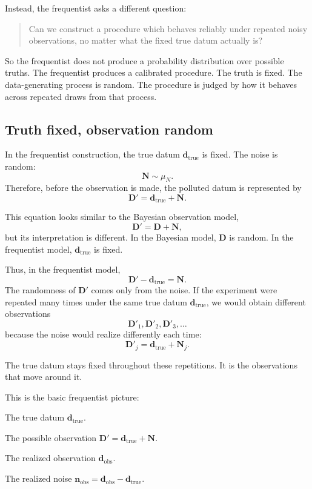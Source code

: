 \documentclass[11pt]{article}
\newcommand{\muN}{\mu_N}
\newcommand{\Drand}{\mathbf D}
\newcommand{\Dobsrand}{\mathbf D'}
\newcommand{\Nrand}{\mathbf N}
\newcommand{\dtrue}{\mathbf d_{\mathrm{true}}}
\newcommand{\dobs}{\mathbf d_{\mathrm{obs}}}
\newcommand{\nobs}{\mathbf n_{\mathrm{obs}}}
\begin{document}
Instead, the frequentist asks a different question:
\begin{quote}
    Can we construct a procedure which behaves reliably under repeated noisy observations, no matter what the fixed true datum actually is?
\end{quote}

So the frequentist does not produce a probability distribution over possible truths. The frequentist produces a calibrated procedure. The truth is fixed. The data-generating process is random. The procedure is judged by how it behaves across repeated draws from that process.

\subsection{Truth fixed, observation random}

In the frequentist construction, the true datum \(\dtrue\) is fixed. The noise is random:
\[
    \Nrand\sim\muN.
\]
Therefore, before the observation is made, the polluted datum is represented by
\[
    \Dobsrand=\dtrue+\Nrand.
\]

This equation looks similar to the Bayesian observation model,
\[
    \Dobsrand=\Drand+\Nrand,
\]
but its interpretation is different. In the Bayesian model, \(\Drand\) is random. In the frequentist model, \(\dtrue\) is fixed.

Thus, in the frequentist model,
\[
    \Dobsrand-\dtrue=\Nrand.
\]
The randomness of \(\Dobsrand\) comes only from the noise. If the experiment were repeated many times under the same true datum \(\dtrue\), we would obtain different observations
\[
    \Dobsrand_1,
    \Dobsrand_2,
    \Dobsrand_3,
    \dots
\]
because the noise would realize differently each time:
\[
    \Dobsrand_j=\dtrue+\Nrand_j.
\]

The true datum stays fixed throughout these repetitions. It is the observations that move around it.

This is the basic frequentist picture:
\begin{description}[leftmargin=3.0cm,style=nextline]
    \item[Fixed object.]
    The true datum \(\dtrue\).

    \item[Random object.]
    The possible observation \(\Dobsrand=\dtrue+\Nrand\).

    \item[Known object after observation.]
    The realized observation \(\dobs\).

    \item[Hidden object after observation.]
    The realized noise \(\nobs=\dobs-\dtrue\).
\end{description}
\end{document}

